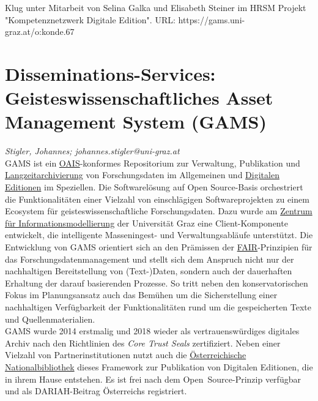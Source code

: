 \documentclass{article}
\begin{document}
Klug unter Mitarbeit von Selina Galka und Elisabeth Steiner im HRSM Projekt "Kompetenznetzwerk Digitale Edition". URL: https://gams.uni-graz.at/o:konde.67\newpage\section*{Disseminations-Services: Geisteswissenschaftliches Asset Management System
               (GAMS)} \emph{Stigler, Johannes; johannes.stigler@uni-graz.at}\\
        
    GAMS ist ein \href{http://gams.uni-graz.at/o:konde.11}{OAIS}-konformes
                  Repositorium zur Verwaltung, Publikation und \href{http://gams.uni-graz.at/o:konde.6}{Langzeitarchivierung} von Forschungsdaten im
                  Allgemeinen und \href{http://gams.uni-graz.at/o:konde.59}{Digitalen
                     Editionen} im Speziellen. Die Softwarelösung auf Open Source-Basis
                  orchestriert die Funktionalitäten einer Vielzahl von einschlägigen
                  Softwareprojekten zu einem Ecosystem für geisteswissenschaftliche Forschungsdaten.
                  Dazu wurde am \href{http://gams.uni-graz.at/o:konde.217}{Zentrum für
                     Informationsmodellierung} der Universität Graz eine Client-Komponente
                  entwickelt, die intelligente Masseningest- und Verwaltungsabläufe unterstützt. Die
                  Entwicklung von GAMS orientiert sich an den Prämissen der \href{http://gams.uni-graz.at/o:konde.7}{FAIR}-Prinzipien für das Forschungsdatenmanagement und
                  stellt sich dem Anspruch nicht nur der nachhaltigen Bereitstellung von
                  (Text-)Daten, sondern auch der dauerhaften Erhaltung der darauf basierenden
                  Prozesse. So tritt neben den konservatorischen Fokus im Planungsansatz auch das
                  Bemühen um die Sicherstellung einer nachhaltigen Verfügbarkeit der
                  Funktionalitäten rund um die gespeicherten Texte und Quellenmaterialien. \\
            
        GAMS wurde 2014 erstmalig und 2018 wieder als vertrauenswürdiges digitales Archiv
                  nach den Richtlinien des \emph{Core Trust Seals} zertifiziert.
                  Neben einer Vielzahl von Partnerinstitutionen nutzt auch die \href{http://gams.uni-graz.at/o:konde.153}{Österreichische Nationalbibliothek} dieses Framework
                  zur Publikation von Digitalen Editionen, die in ihrem Hause entstehen. Es ist frei
                  nach dem Open Source-Prinzip verfügbar und als DARIAH-Beitrag Österreichs
                  registriert.\\
            
\end{document}
